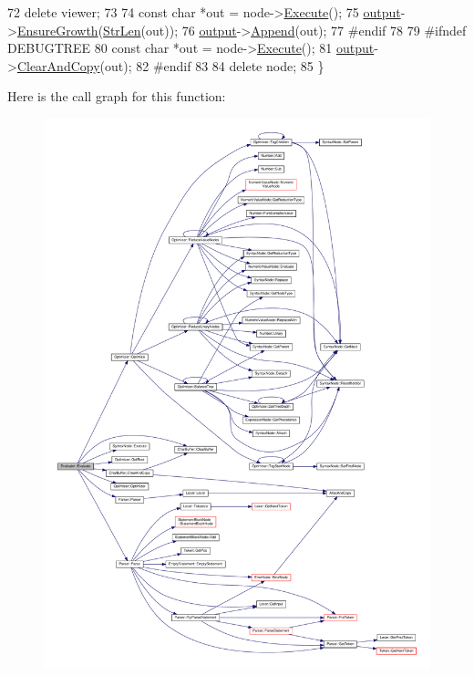 \begin{DoxyCode}
72     \textcolor{keyword}{delete} viewer;
73 
74     \textcolor{keyword}{const} \textcolor{keywordtype}{char} *out = node->\hyperlink{classSyntaxNode_ad8418608fa224536b48a590c87f0a509}{Execute}();
75     \hyperlink{classEvaluator_a35018fd9dd13289a6dbf967cd1acd13c}{output}->\hyperlink{classCharBuffer_a73c71d361110b37819a1d681a1504b0e}{EnsureGrowth}(\hyperlink{clib_8h_a67ec56eb98b49515d35005a5b3bf9a32}{StrLen}(out));
76     \hyperlink{classEvaluator_a35018fd9dd13289a6dbf967cd1acd13c}{output}->\hyperlink{classCharBuffer_a045b38735f7b3007c1b98d3d7b7feafe}{Append}(out);
77 \textcolor{preprocessor}{#endif}
78 
79 \textcolor{preprocessor}{#ifndef DEBUGTREE}
80     \textcolor{keyword}{const} \textcolor{keywordtype}{char} *out = node->\hyperlink{classSyntaxNode_ad8418608fa224536b48a590c87f0a509}{Execute}();
81     \hyperlink{classEvaluator_a35018fd9dd13289a6dbf967cd1acd13c}{output}->\hyperlink{classCharBuffer_ac52ed7b91190240eb7db4cf43d1e2abb}{ClearAndCopy}(out);
82 \textcolor{preprocessor}{#endif}
83 
84     \textcolor{keyword}{delete} node;
85 \}
\end{DoxyCode}


Here is the call graph for this function\+:\nopagebreak
\begin{figure}[H]
\begin{center}
\leavevmode
\includegraphics[width=350pt]{classEvaluator_a40b30ece9d43c658877ee7f52aaec0a8_cgraph}
\end{center}
\end{figure}





